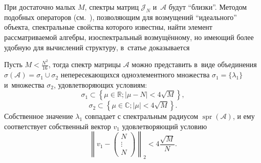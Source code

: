 При достаточно малых \( M \),
 спектры матриц \( \mathcal{J}_N \) и~\( \mathscr{A} \) будут ``близки''.
Методом подобных операторов (см.~\cite{baskakov-harmonic,baskakov1983}),
 позволяющим для возмущений ``идеального'' объекта, спектральные свойства которого известны,
 найти элемент рассматриваемой алгебры, изоспектральный возмущ\"енному,
 но имеющий более удобную для вычислений структуру,
 в~статье доказывается
\begin{thm}\label{kozlukovsv:thm:almost-all-ones}
    Пусть \( M < \frac{N^2}{16} \),
    тогда спектр матрицы \( \mathscr{A} \) можно представить в~виде
    объединения \( \sigma\left(\mathscr{A}\right) = \sigma_1 \cup \sigma_2 \)
    непересекающихся
    одноэлементного множества \( \sigma_1=\{\lambda_1\} \)
    и~множества \( \sigma_2 \), удовлетворяющих условиям:
    \[ \sigma_1 \subset \left\{ \mu\in\mathbb{R}; \lvert \mu - N \rvert < 4\sqrt{M} \right\}, \]
    \[ \sigma_2 \subset \left\{ \mu\in\mathbb{C}; \lvert \mu \rvert < 4\sqrt{M} \right\}. \]
    Собственное значение \( \lambda_1 \) совпадает с спектральным радиусом
    \( \operatorname{spr}(\mathscr{A}) \),
    и ему соответствует собственный вектор \( v_1 \)
    удовлетворяющий условию
    \[ \left\|v_1 - \begin{pmatrix} N\\ \vdots \\ N\end{pmatrix}\right\|_2 < 4\frac{\sqrt{M}}{N}. \]
\end{thm}
